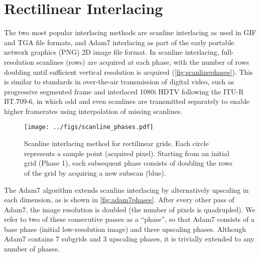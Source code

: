 \documentclass[aip, amsmath, amssymb, nobibnotes, nofootinbib, citeautoscript, reprint, superscriptaddress]{revtex4-1}
\begin{document}


    \section{Rectilinear Interlacing}
    \label{sec:rect}

    The two most popular interlacing methods are scanline interlacing as used in GIF and TGA file formats, and Adam7 interlacing as part of the early portable network graphics (PNG) 2D image file format\cite{rfc2083}.
    In scanline interlacing, full-resolution scanlines (rows) are acquired at each
    phase, with the number of rows doubling until sufficient vertical resolution is
    acquired (\autoref{fig:scanlinephases}).
    This is similar to standards in over-the-air transmission of digital video, such
    as progressive segmented frame and interlaced 1080i HDTV following the ITU-R
    BT.709-6, in which odd and even scanlines are transmitted separately to enable higher
    framerates using interpolation of missing scanlines.

    \begin{figure*}
        \centering
        \texttt{[image: ../figs/scanline\_phases.pdf]}
        \caption{\label{fig:scanlinephases}
            Scanline interlacing method for rectilinear grids.
            Each circle represents a sample point (acquired pixel).
            Starting from an initial grid (Phase 1), each subsequent phase consists of
            doubling the rows of the grid by acquiring a new subscan (blue).
            }
    \end{figure*}

    The Adam7 algorithm extends scanline interlacing by alternatively upscaling in
    each dimension, as is shown in \autoref{fig:adam7phases}.
    After every other pass of Adam7, the image resolution is doubled (the number of pixels is quadrupled).
    We refer to two of these consecutive passes as a ``phase'', so that Adam7
    consists of a base phase (initial low-resolution image) and three upscaling phases.
    Although Adam7 contains 7 subgrids and 3 upscaling phases, it is trivially extended to any number of phases.
\end{document}
